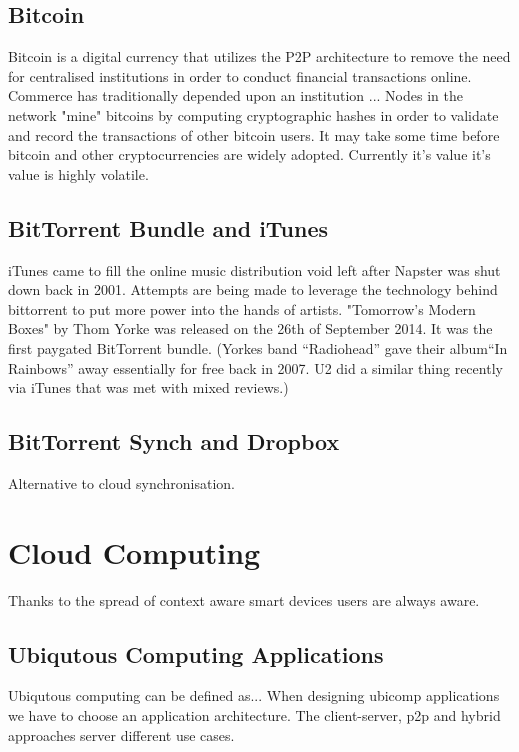 \documentclass[11pt]{amsart}
\begin{document}
\subsection{Bitcoin} 

Bitcoin is a digital currency that utilizes the P2P architecture to remove the need for centralised institutions in order to conduct financial transactions online. Commerce has traditionally depended upon an institution ... 
Nodes in the network "mine" bitcoins by computing cryptographic hashes in order to validate and record the transactions of other bitcoin users. It may take some time before bitcoin and other cryptocurrencies are widely adopted. Currently it's value it's value is highly volatile.

\subsection{BitTorrent Bundle and iTunes}

iTunes came to fill the online music distribution void left after Napster was shut down back in 2001. 
Attempts are being made to leverage the technology behind bittorrent to put more power into the hands of artists. "Tomorrow's Modern Boxes" by Thom Yorke was released on the 26th of September 2014. It was the first paygated BitTorrent bundle. (Yorkes band ``Radiohead'' gave their album``In Rainbows'' away essentially for free back in 2007. U2 did a similar thing recently via iTunes that was met with mixed reviews.)

\subsection{BitTorrent Synch and Dropbox}

Alternative to cloud synchronisation.

\section{Cloud Computing}

Thanks to the spread of context aware smart devices users are always aware.

\subsection{Ubiqutous Computing Applications}

Ubiqutous computing  can be defined as... 
When designing ubicomp applications we have to choose an application architecture. The client-server, p2p and hybrid approaches server different use cases. 
\end{document}
